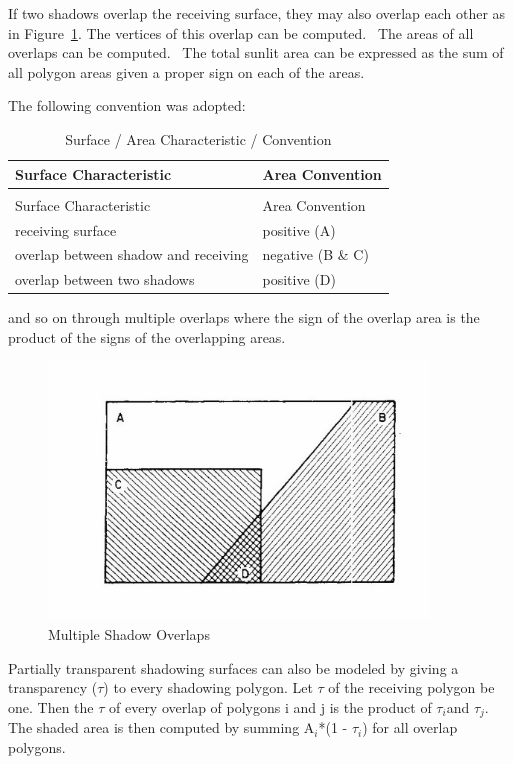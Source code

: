 If two shadows overlap the receiving surface, they may also overlap each other as in Figure~\ref{fig:multiple-shadow-overlaps}. The vertices of this overlap can be computed.~ The areas of all overlaps can be computed.~ The total sunlit area can be expressed as the sum of all polygon areas given a proper sign on each of the areas.

The following convention was adopted:

\begin{longtable}[c]{@{}ll@{}}
\caption{Surface / Area Characteristic / Convention \label{table:surface-area-characteristic-convention}} \tabularnewline
\toprule 
Surface Characteristic & Area Convention \tabularnewline
\midrule
\endfirsthead

\caption[]{Surface / Area Characteristic / Convention} \tabularnewline
\toprule 
Surface Characteristic & Area Convention \tabularnewline
\midrule
\endhead

receiving surface & positive (A) \tabularnewline
overlap between shadow and receiving & negative (B  \&  C) \tabularnewline
overlap between two shadows & positive (D) \tabularnewline
\bottomrule
\end{longtable}

and so on through multiple overlaps where the sign of the overlap area is the product of the signs of the overlapping areas.

\begin{figure}[hbtp] %
\centering
\includegraphics[width=0.9\textwidth, height=0.9\textheight, keepaspectratio=true]{media/image642.png}
\caption{Multiple Shadow Overlaps \protect \label{fig:multiple-shadow-overlaps}}
\end{figure}

Partially transparent shadowing surfaces can also be modeled by giving a transparency ($\tau$) to every shadowing polygon. Let $\tau$ of the receiving polygon be one. Then the $\tau$ of every overlap of polygons i and j is the product of $\tau$\(_{i}\)and $\tau$\(_{j}\). The shaded area is then computed by summing A\(_{i}\)*(1 - $\tau$\(_{i}\)) for all overlap polygons.

